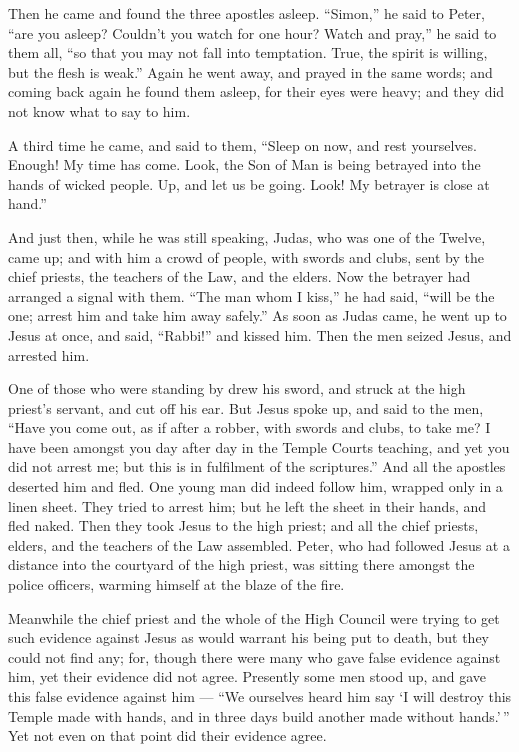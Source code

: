  Then he came and found the three apostles asleep.
``Simon,'' he said to Peter, ``are you asleep? Couldn't you watch for
one hour?  Watch and pray,'' he said to them all, ``so that
you may not fall into temptation. True, the spirit is willing, but the
flesh is weak.''  Again he went away, and prayed in the
same words;  and coming back again he found them asleep,
for their eyes were heavy; and they did not know what to say to him.

 A third time he came, and said to them, ``Sleep on now,
and rest yourselves. Enough! My time has come. Look, the Son of Man is
being betrayed into the hands of wicked people.  Up, and
let us be going. Look! My betrayer is close at hand.''

 And just then, while he was still speaking, Judas, who was
one of the Twelve, came up; and with him a crowd of people, with swords
and clubs, sent by the chief priests, the teachers of the Law, and the
elders.  Now the betrayer had arranged a signal with them.
``The man whom I kiss,'' he had said, ``will be the one; arrest him and
take him away safely.''  As soon as Judas came, he went up
to Jesus at once, and said, ``Rabbi!'' and kissed him. 
Then the men seized Jesus, and arrested him.

 One of those who were standing by drew his sword, and
struck at the high priest's servant, and cut off his ear. 
But Jesus spoke up, and said to the men, ``Have you come out, as if
after a robber, with swords and clubs, to take me?  I have
been amongst you day after day in the Temple Courts teaching, and yet
you did not arrest me; but this is in fulfilment of the scriptures.''
 And all the apostles deserted him and fled. 
One young man did indeed follow him, wrapped only in a linen sheet. They
tried to arrest him;  but he left the sheet in their hands,
and fled naked.  Then they took Jesus to the high priest;
and all the chief priests, elders, and the teachers of the Law
assembled.  Peter, who had followed Jesus at a distance
into the courtyard of the high priest, was sitting there amongst the
police officers, warming himself at the blaze of the fire.

 Meanwhile the chief priest and the whole of the High
Council were trying to get such evidence against Jesus as would warrant
his being put to death, but they could not find any;  for,
though there were many who gave false evidence against him, yet their
evidence did not agree.  Presently some men stood up, and
gave this false evidence against him ---  ``We ourselves
heard him say `I will destroy this Temple made with hands, and in three
days build another made without hands.'\,''  Yet not even
on that point did their evidence agree.

